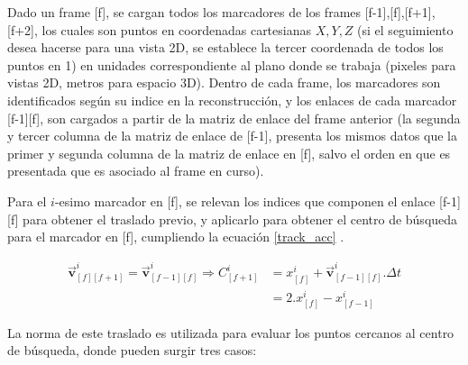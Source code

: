 Dado un frame [f], se cargan todos los marcadores de los frames [f-1],[f],[f+1],[f+2], los cuales son puntos en coordenadas cartesianas $X,Y,Z$ (si el seguimiento desea hacerse para una vista 2D, se establece la tercer coordenada de todos los puntos en 1) en unidades correspondiente al plano donde se trabaja (pixeles para vistas 2D, metros para espacio 3D). Dentro de cada frame, los marcadores son identificados según su indice en la reconstrucción, y los enlaces de cada marcador [f-1][f], son cargados a partir de la matriz de enlace del frame anterior (la segunda y tercer columna de la matriz de enlace de [f-1], presenta los mismos datos que la primer y segunda columna de la matriz de enlace en [f], salvo el orden en que es presentada que es asociado al frame en curso).

Para el $i$-esimo marcador en [f], se relevan los indices que componen el enlace [f-1][f] para obtener el traslado previo, y aplicarlo para obtener el centro de búsqueda para el marcador en [f], cumpliendo la ecuación \ref{track_acc} .

\begin{equation}
\begin{split}
\boldsymbol{\overrightarrow{v}}_{[f][f+1]}^{i} = \boldsymbol{\overrightarrow{v}}_{[f-1][f]}^{i} \Rightarrow C_{[f+1]}^{i} &= x_{[f]}^{i} + \boldsymbol{\overrightarrow{v}}_{[f-1][f]}^{i}.\Delta{t} \\
&= 2.x_{[f]}^{i} -x_{[f-1]}^{i} 
\end{split}
\label{centro_busqueda_f1}
\end{equation}

La norma de este traslado es utilizada para evaluar los puntos cercanos al centro de búsqueda, donde pueden surgir tres casos:

